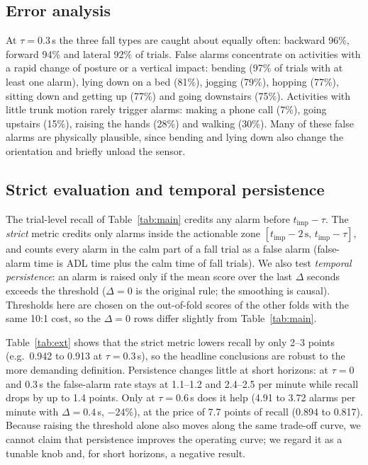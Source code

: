 \documentclass[conference]{IEEEtran}
\begin{document}
\subsection{Error analysis}
At $\tau=0.3$\,s the three fall types are caught about equally often: backward 96\%, forward 94\% and lateral 92\% of trials. False alarms concentrate on activities with a rapid change of posture or a vertical impact: bending (97\% of trials with at least one alarm), lying down on a bed (81\%), jogging (79\%), hopping (77\%), sitting down and getting up (77\%) and going downstairs (75\%). Activities with little trunk motion rarely trigger alarms: making a phone call (7\%), going upstairs (15\%), raising the hands (28\%) and walking (30\%). Many of these false alarms are physically plausible, since bending and lying down also change the orientation and briefly unload the sensor.

\subsection{Strict evaluation and temporal persistence}\label{sec:ext}
The trial-level recall of Table~\ref{tab:main} credits any alarm before $t_{\mathrm{imp}}-\tau$. The \emph{strict} metric credits only alarms inside the actionable zone $[t_{\mathrm{imp}}-2\,\mathrm{s},\,t_{\mathrm{imp}}-\tau]$, and counts every alarm in the calm part of a fall trial as a false alarm (false-alarm time is ADL time plus the calm time of fall trials). We also test \emph{temporal persistence}: an alarm is raised only if the mean score over the last $\Delta$ seconds exceeds the threshold ($\Delta=0$ is the original rule; the smoothing is causal). Thresholds here are chosen on the out-of-fold scores of the other folds with the same 10:1 cost, so the $\Delta=0$ rows differ slightly from Table~\ref{tab:main}.

Table~\ref{tab:ext} shows that the strict metric lowers recall by only 2--3 points (e.g.\ 0.942 to 0.913 at $\tau=0.3$\,s), so the headline conclusions are robust to the more demanding definition. Persistence changes little at short horizons: at $\tau=0$ and 0.3\,s the false-alarm rate stays at 1.1--1.2 and 2.4--2.5 per minute while recall drops by up to 1.4 points. Only at $\tau=0.6$\,s does it help (4.91 to 3.72 alarms per minute with $\Delta=0.4$\,s, $-24\%$), at the price of 7.7 points of recall (0.894 to 0.817). Because raising the threshold alone also moves along the same trade-off curve, we cannot claim that persistence improves the operating curve; we regard it as a tunable knob and, for short horizons, a negative result.
\end{document}
